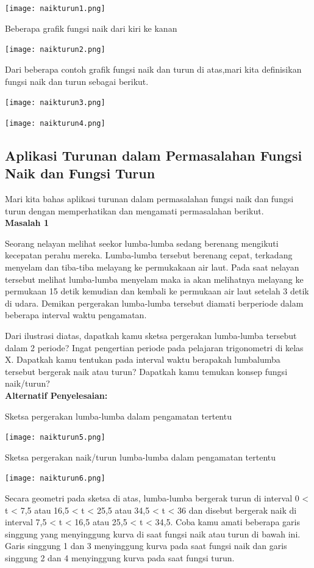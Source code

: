 \documentclass[11pt,fleqn]{book} %
\begin{document}
\texttt{[image: naikturun1.png]}

Beberapa grafik fungsi naik dari kiri ke kanan

\texttt{[image: naikturun2.png]}

Dari beberapa contoh grafik fungsi naik dan turun di atas,mari kita definisikan fungsi naik dan turun sebagai berikut.

\texttt{[image: naikturun3.png]}

\texttt{[image: naikturun4.png]}

\subsection{Aplikasi Turunan dalam Permasalahan Fungsi Naik dan Fungsi Turun}

Mari kita bahas aplikasi turunan dalam permasalahan fungsi naik dan fungsi turun dengan memperhatikan dan mengamati permasalahan berikut.\\

\textbf{Masalah 1}

Seorang nelayan melihat seekor lumba-lumba sedang berenang mengikuti kecepatan perahu mereka. Lumba-lumba tersebut berenang cepat, terkadang menyelam dan tiba-tiba melayang ke permukakaan air laut. Pada saat nelayan tersebut melihat lumba-lumba menyelam maka ia akan melihatnya melayang ke permukaan 15 detik kemudian dan kembali ke permukaan air laut setelah 3 detik di udara. Demikan pergerakan lumba-lumba tersebut diamati berperiode dalam beberapa interval waktu pengamatan.

Dari ilustrasi diatas, dapatkah kamu sketsa pergerakan lumba-lumba tersebut dalam 2 periode? Ingat pengertian periode pada pelajaran trigonometri di kelas X. Dapatkah kamu tentukan pada interval waktu berapakah lumbalumba tersebut bergerak naik atau turun? Dapatkah kamu temukan konsep fungsi naik/turun?\\

\textbf{Alternatif Penyelesaian:}

Sketsa pergerakan lumba-lumba dalam pengamatan tertentu

\texttt{[image: naikturun5.png]}

Sketsa pergerakan naik/turun lumba-lumba dalam pengamatan tertentu

\texttt{[image: naikturun6.png]}

Secara geometri pada sketsa di atas, lumba-lumba bergerak turun di interval 0 < t < 7,5 atau 16,5 < t < 25,5 atau 34,5 < t < 36 dan disebut bergerak naik di interval 7,5 < t < 16,5 atau 25,5 < t < 34,5.
Coba kamu amati beberapa garis singgung yang menyinggung kurva di saat fungsi naik atau turun di bawah ini. Garis singgung 1 dan 3 menyinggung kurva pada saat fungsi naik dan garis singgung 2 dan 4 menyinggung kurva pada saat fungsi turun.
\end{document}
